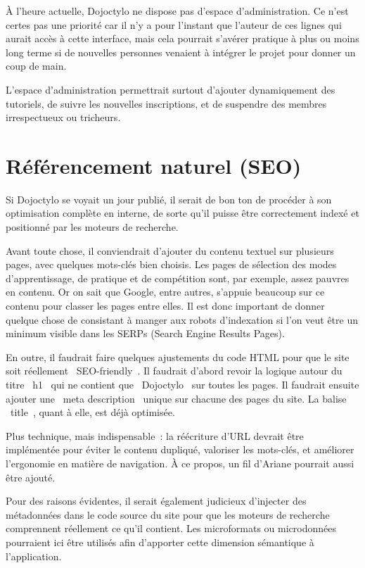 \documentclass[a4paper,12pt]{article}
\begin{document}
À l'heure actuelle, Dojoctylo ne dispose pas d'espace d'administration. Ce n'est certes pas une priorité car il n'y a pour l'instant que l'auteur de ces lignes qui aurait accès à cette interface, mais cela pourrait s'avérer pratique à plus ou moins long terme si de nouvelles personnes venaient à intégrer le projet pour donner un coup de main.

L'espace d'administration permettrait surtout d'ajouter dynamiquement des tutoriels, de suivre les nouvelles inscriptions, et de suspendre des membres irrespectueux ou tricheurs.

\section{Référencement naturel (SEO)}

Si Dojoctylo se voyait un jour publié, il serait de bon ton de procéder à son optimisation complète en interne, de sorte qu'il puisse être correctement indexé et positionné par les moteurs de recherche.

Avant toute chose, il conviendrait d'ajouter du contenu textuel sur plusieurs pages, avec quelques mots-clés bien choisis. Les pages de sélection des modes d'apprentissage, de pratique et de compétition sont, par exemple, assez pauvres en contenu. Or on sait que Google, entre autres, s'appuie beaucoup sur ce contenu pour classer les pages entre elles. Il est donc important de donner quelque chose de consistant à manger aux robots d'indexation si l'on veut être un minimum visible dans les SERPs (Search Engine Results Pages).

En outre, il faudrait faire quelques ajustements du code HTML pour que le site soit réellement \og~SEO-friendly~\fg. Il faudrait d'abord revoir la logique autour du titre \og~h1~\fg{} qui ne contient que \og~Dojoctylo~\fg{} sur toutes les pages. Il faudrait ensuite ajouter une \og~meta description~\fg{} unique sur chacune des pages du site. La balise \og~title~\fg, quant à elle, est déjà optimisée.

Plus technique, mais indispensable~: la réécriture d'URL devrait être implémentée pour éviter le contenu dupliqué, valoriser les mots-clés, et améliorer l'ergonomie en matière de navigation. À ce propos, un fil d'Ariane pourrait aussi être ajouté.

Pour des raisons évidentes, il serait également judicieux d'injecter des métadonnées dans le code source du site pour que les moteurs de recherche comprennent réellement ce qu'il contient. Les microformats ou microdonnées pourraient ici être utilisés afin d'apporter cette dimension sémantique à l'application.
\end{document}
